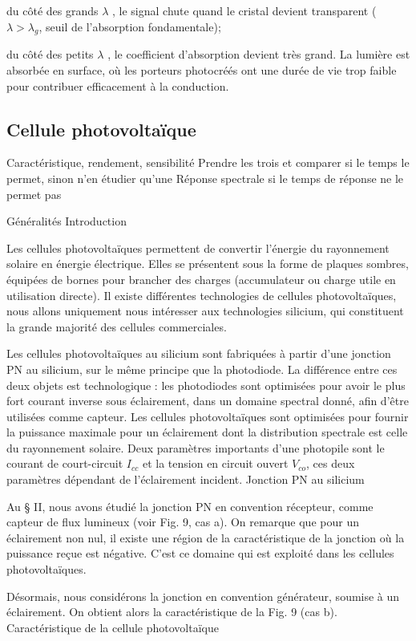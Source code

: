 \documentclass{article}%
\begin{document}
    du côté des grands $\lambda$ , le signal chute quand le cristal devient transparent ( $\lambda > \lambda _{g}$, seuil de l'absorption fondamentale);

    du côté des petits $\lambda$ , le coefficient d'absorption devient très grand. La lumière est absorbée en surface, où les porteurs photocréés ont une durée de vie trop faible pour contribuer efficacement à la conduction.

\subsection{Cellule photovoltaïque}
Caractéristique, rendement, sensibilité
Prendre les trois et comparer si le temps le permet, sinon n'en étudier qu'une
Réponse spectrale si le temps de réponse ne le permet pas

Généralités
Introduction

Les cellules photovoltaïques permettent de convertir l'énergie du rayonnement solaire en énergie électrique. Elles se présentent sous la forme de plaques sombres, équipées de bornes pour brancher des charges (accumulateur ou charge utile en utilisation directe). Il existe différentes technologies de cellules photovoltaïques, nous allons uniquement nous intéresser aux technologies silicium, qui constituent la grande majorité des cellules commerciales.

Les cellules photovoltaïques au silicium sont fabriquées à partir d'une jonction PN au silicium, sur le même principe que la photodiode. La différence entre ces deux objets est technologique : les photodiodes sont optimisées pour avoir le plus fort courant inverse sous éclairement, dans un domaine spectral donné, afin d'être utilisées comme capteur. Les cellules photovoltaïques sont optimisées pour fournir la puissance maximale pour un éclairement dont la distribution spectrale est celle du rayonnement solaire. Deux paramètres importants d'une photopile sont le courant de court-circuit $I_{cc}$ et la tension en circuit ouvert $V_{co}$, ces deux paramètres dépendant de l'éclairement incident.
Jonction PN au silicium

Au § II, nous avons étudié la jonction PN en convention récepteur, comme capteur de flux lumineux (voir Fig. 9, cas a). On remarque que pour un éclairement non nul, il existe une région de la caractéristique de la jonction où la puissance reçue est négative. C'est ce domaine qui est exploité dans les cellules photovoltaïques.

Désormais, nous considérons la jonction en convention générateur, soumise à un éclairement. On obtient alors la caractéristique de la Fig. 9 (cas b).
Caractéristique de la cellule photovoltaïque
\end{document}
